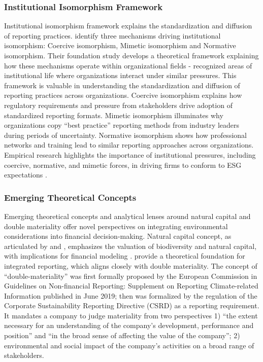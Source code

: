\documentclass[
  authoryear]{elsarticle}
\begin{document}
\subsubsection{Institutional Isomorphism
Framework}\label{institutional-isomorphism-framework}

Institutional isomorphism framework explains the standardization and
diffusion of reporting practices. \citet{DIMAGGIO1983} identify three
mechanisms driving institutional isomorphism: Coercive isomorphism,
Mimetic isomorphism and Normative isomorphism. Their foundation study
develops a theoretical framework explaining how these mechanisms operate
within organizational fields - recognized areas of institutional life
where organizations interact under similar pressures. This framework is
valuable in understanding the standardization and diffusion of reporting
practices across organizations. Coercive isomorphism explains how
regulatory requirements and pressure from stakeholders drive adoption of
standardized reporting formats. Mimetic isomorphism illuminates why
organizations copy ``best practice'' reporting methods from industry
leaders during periods of uncertainty. Normative isomorphism shows how
professional networks and training lead to similar reporting approaches
across organizations. Empirical research highlights the importance of
institutional pressures, including coercive, normative, and mimetic
forces, in driving firms to conform to ESG expectations
\citep{DELMAS2004, HIGGINS2014, BEBBINGTON2018, CHRISTENSEN2021}.

\subsubsection{Emerging Theoretical
Concepts}\label{emerging-theoretical-concepts}

Emerging theoretical concepts and analytical lenses around natural
capital and double materiality offer novel perspectives on integrating
environmental considerations into financial decision-making. Natural
capital concept, as articulated by \citet{DASGUPTA2021} and
\citet{DAILY2009}, emphasizes the valuation of biodiversity and natural
capital, with implications for financial modeling \citep{ATKINSON2014}.
\citet{ECCLES2014} provide a theoretical foundation for integrated
reporting, which aligns closely with double materiality. The concept of
``double-materiality'' was first formally proposed by the European
Commission \citep{EC2019} in Guidelines on Non-financial Reporting:
Supplement on Reporting Climate-related Information published in June
2019; then was formalized by the regulation of the Corporate
Sustainability Reporting Directive (CSRD)\citep[see][]{EU_CSRD_2022} as
a reporting requirement. It mandates a company to judge materiality from
two perspectives 1) ``the extent necessary for an understanding of the
company's development, performance and position'' and ``in the broad
sense of affecting the value of the company''; 2) environmental and
social impact of the company's activities on a broad range of
stakeholders.
\end{document}
